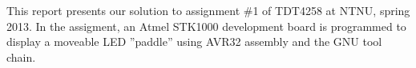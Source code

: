 This report presents our solution to assignment \#1 of TDT4258 at NTNU, spring 2013.
In the assigment, an Atmel STK1000 development board is programmed to display a moveable LED ''paddle'' using AVR32 assembly and the GNU tool chain. 
